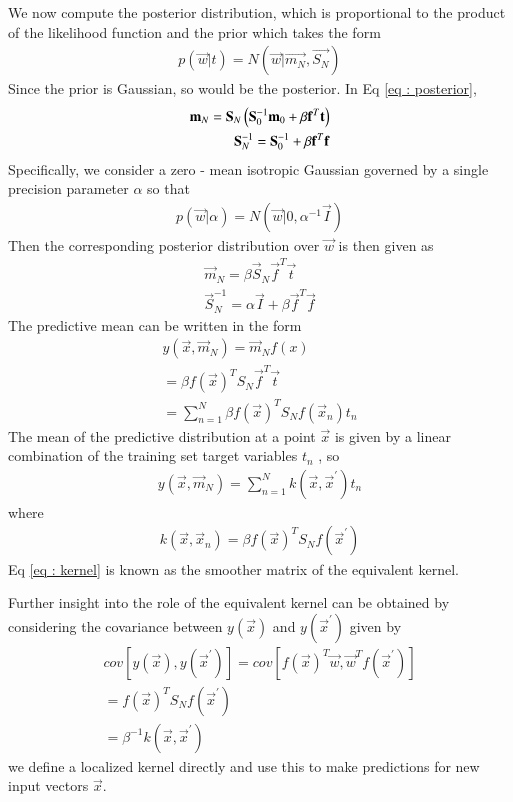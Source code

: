 \documentclass[journal,12pt,twocolumn]{IEEEtran}
\begin{document}
We now compute the posterior distribution, which is proportional to the product of the likelihood function and the prior which takes the form
\begin{align}
    p(\vec{w} | t) = N(\vec{w} | \vec{m_{N}},\vec{S_{N}}) \label{eq : posterior}
\end{align}
Since the prior is Gaussian, so would be the posterior.
In Eq \eqref{eq : posterior},
\begin{align}
       \mathbf{m}_{N} = \mathbf{S}_{N}\left(\mathbf{S}_{0}^{-1}\mathbf{m}_{0} + \beta \mathbf{f}^T \mathbf{t}\right)\\
       \mathbf{S}_{N}^{-1} = \mathbf{S}_{0}^{-1} + \beta \mathbf{f}^{T} \mathbf{f}
\end{align}
Specifically, we consider a zero - mean isotropic Gaussian governed by a single precision parameter $\alpha$ so that
\begin{align}
    p(\vec{w} | \alpha) = N(\vec{w} | 0, \alpha^{-1} \vec{I})
\end{align}
Then the corresponding posterior distribution over $\vec{w}$ is then given as
\begin{align}
    \vec{m}_{N} = \beta\vec{S}_{N} \vec{f}^T \vec{t} \label{eq : mean}\\
    \vec{S}_{N}^{-1} = \alpha \vec{I} + \beta \vec{f}^{T} \vec{f}
\end{align}
The predictive mean can be written in the form
\begin{multline}
     y(\vec{x},\vec{m}_{N}) = \vec{m}_{N} f(x)\\
        = \beta f(\vec{x})^{T} S_{N} \vec{f}^{T} \vec{t} \\
        = \sum_{n=1}^{N} \beta f(\vec{x})^{T} S_{N} f(\vec{x}_{n}) t_{n}
\end{multline}
The mean of the predictive distribution at a point $\vec{x}$ is given by a linear combination of the training set target variables $t_{n}$ , so
\begin{align}
    y(\vec{x},\vec{m}_{N}) = \sum_{n=1}^{N} k(\vec{x},\vec{x}^{'}) t_{n}
\end{align}
where
\begin{align}
    k(\vec{x},\vec{x}_{n}) = \beta f(\vec{x})^{T} S_{N} f(\vec{x}^{'}) \label{eq : kernel}
\end{align}
Eq \eqref{eq : kernel} is known as the smoother matrix of the equivalent kernel.

Further insight into the role of the equivalent kernel can be obtained by considering the covariance between $y(\vec{x})$ and $y(\vec{x}^{'})$ given by
\begin{align}
    cov[y(\vec{x}),y(\vec{x}^{'})] = cov[f(\vec{x})^{T}\vec{w}, \vec{w}^{T}f(\vec{x}^{'})]\\
         = f(\vec{x})^{T} S_{N} f(\vec{x}^{'})\\
         = \beta^{-1}k(\vec{x},\vec{x}^{'})
\end{align}
we define a localized kernel directly and use this to make predictions for new input vectors $\vec{x}$.
\end{document}
